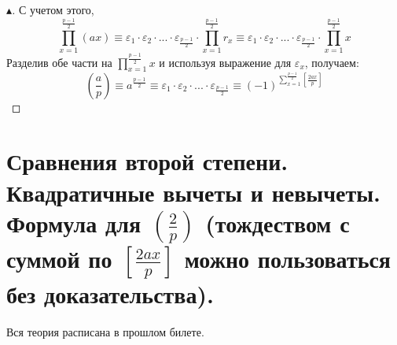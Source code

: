 \begin{theorem}
\begin{proof}[$\blacktriangle$]
        С учетом этого,
        $$
        \prod \limits_{x = 1}^{\frac{p-1}{2}} (ax) \equiv \varepsilon_1 \cdot \varepsilon_2 \cdot ... \cdot \varepsilon_{\frac{p-1}{2}} \cdot \prod \limits_{x = 1}^{\frac{p - 1}{2}} r_x \equiv \varepsilon_1 \cdot \varepsilon_2 \cdot ... \cdot \varepsilon_{\frac{p-1}{2}} \cdot \prod \limits_{x = 1}^{\frac{p - 1}{2}} x
        $$
        Разделив обе части на $\prod \limits_{x = 1}^{\frac{p - 1}{2}} x$ и используя выражение для $\varepsilon_x$, получаем:
        $$
            \left(\frac{a}{p}\right) \equiv a^{\frac{p-1}{2}} \equiv \varepsilon_1 \cdot \varepsilon_2 \cdot ... \cdot \varepsilon_{\frac{p-1}{2}} \equiv (-1)^{\sum \limits_{x = 1}^{\frac{p-1}{2}} \left[ \frac{2ax}{p} \right] }
        $$
    \end{proof}
\end{theorem}


\section{Сравнения второй степени. Квадратичные вычеты и невычеты. Формула для \texorpdfstring{$\left(\frac{2}{p}\right)$}{(p/2)} (тождеством с суммой \texorpdfstring{по $\left[ \frac{2ax}{p} \right]$}{} можно пользоваться без доказательства).}

Вся теория расписана в прошлом билете.\\


